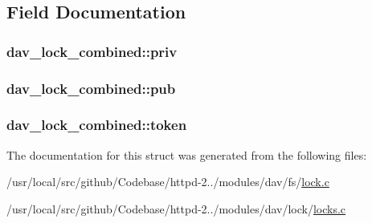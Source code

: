 \subsection{Field Documentation}
\subsubsection[{\texorpdfstring{priv}{priv}}]{ dav\+\_\+lock\+\_\+combined\+::priv}\hypertarget{structdav__lock__combined_a9c31b6b4984b2144aa3f639a542b0aed}{}\label{structdav__lock__combined_a9c31b6b4984b2144aa3f639a542b0aed}
\subsubsection[{\texorpdfstring{pub}{pub}}]{ dav\+\_\+lock\+\_\+combined\+::pub}\hypertarget{structdav__lock__combined_a14f3b42977b444d08cb4518c69bed4d5}{}\label{structdav__lock__combined_a14f3b42977b444d08cb4518c69bed4d5}
\subsubsection[{\texorpdfstring{token}{token}}]{ dav\+\_\+lock\+\_\+combined\+::token}\hypertarget{structdav__lock__combined_aec1288cb93eaaa7cf487dbbf8f72163b}{}\label{structdav__lock__combined_aec1288cb93eaaa7cf487dbbf8f72163b}


The documentation for this struct was generated from the following files\+:\begin{DoxyCompactItemize}
\item 
/usr/local/src/github/\+Codebase/httpd-\/2../modules/dav/fs/\hyperlink{lock_8c}{lock.\+c}\item 
/usr/local/src/github/\+Codebase/httpd-\/2../modules/dav/lock/\hyperlink{locks_8c}{locks.\+c}\end{DoxyCompactItemize}
